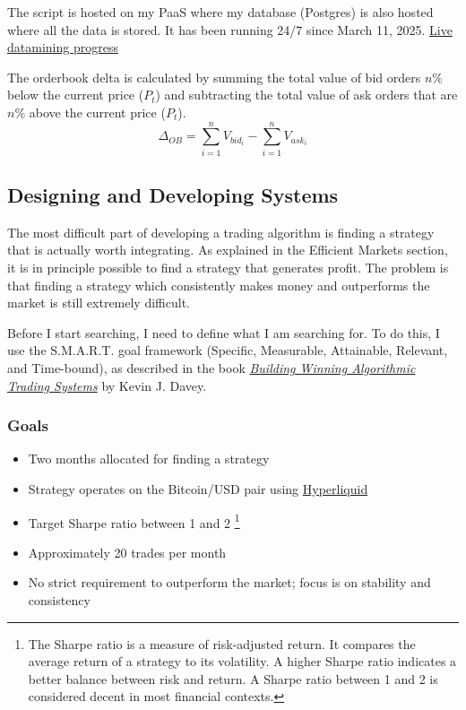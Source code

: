 \documentclass[12pt]{article}
\begin{document}
The script is hosted on my PaaS where my database (Postgres) is also hosted where all the data is stored. It has been running 24/7 since March 11, 2025.
\href{https://customchart-production.up.railway.app/#}{Live datamining progress}

The orderbook delta is calculated by summing the total value of bid orders $n\%$ below the current price ($P_t$) and subtracting the total value of ask orders that are $n\%$ above the current price ($P_t$).
\begin{equation*}
    \Delta_{OB} = \sum_{i=1}^{n} V_{bid_i} - \sum_{i=1}^{n} V_{ask_i}
\end{equation*}




\newpage
\subsection{Designing and Developing Systems}


The most difficult part of developing a trading algorithm is finding a strategy that is actually worth integrating. As explained in the Efficient Markets section, it is in principle possible to find a strategy that generates profit. The problem is that finding a strategy which consistently makes money and outperforms the market is still extremely difficult.

Before I start searching, I need to define what I am searching for. To do this, I use the S.M.A.R.T. goal framework (Specific, Measurable, Attainable, Relevant, and Time-bound), as described in the book \href{https://www.amazon.com/Building-Winning-Algorithmic-Trading-Systems/dp/1118778987}{\textit{Building Winning Algorithmic Trading Systems}} by Kevin J. Davey.

\subsubsection*{Goals}
\begin{itemize}
    \item Two months allocated for finding a strategy
    \item Strategy operates on the Bitcoin/USD pair using \href{https://hyperfoundation.org/}{Hyperliquid}
    \item Target Sharpe ratio between 1 and 2 \footnote{The Sharpe ratio is a measure of risk-adjusted return. It compares the average return of a strategy to its volatility. A higher Sharpe ratio indicates a better balance between risk and return. A Sharpe ratio between 1 and 2 is considered decent in most financial contexts.}
    \item Approximately 20 trades per month
    \item No strict requirement to outperform the market; focus is on stability and consistency
\end{itemize}
\end{document}

